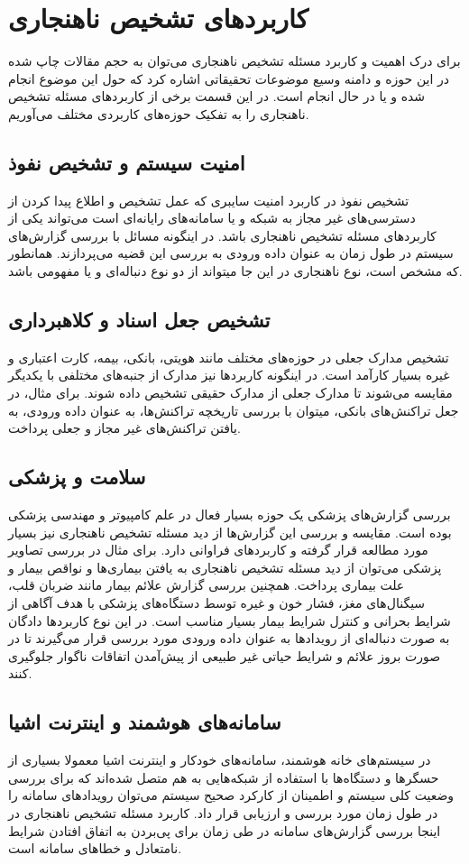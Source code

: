 \documentclass[12pt,a4paper]{report}
\begin{document}
\section {کاربرد‌های تشخیص ناهنجاری}
برای درک اهمیت و کاربرد مسئله تشخیص ناهنجاری می‌توان به حجم مقالات چاپ شده در این حوزه و دامنه وسیع موضوعات تحقیقاتی اشاره کرد که حول این موضوع انجام شده و یا در حال انجام است. در این قسمت برخی از کاربرد‌های مسئله تشخیص ناهنجاری را به تفکیک حوزه‌های کاربردی مختلف می‌آوریم.

\subsection{امنیت سیستم و تشخیص نفوذ}
تشخیص نفوذ در کاربرد امنیت سایبری که عمل تشخیص و اطلاع پیدا کردن از دسترسی‌های غیر مجاز به شبکه و یا سامانه‌های رایانه‌ای است می‌تواند یکی از کاربرد‌های مسئله تشخیص ناهنجاری باشد. در اینگونه مسائل با بررسی گزارش‌های سیستم در طول زمان به عنوان داده ورودی به بررسی این قضیه می‌پردازند. همانطور که مشخص است، نوع  ناهنجاری در این جا میتواند از دو نوع دنباله‌ای و یا مفهومی باشد.

\subsection{تشخیص جعل اسناد و کلاهبرداری}
تشخیص مدارک جعلی در حوزه‌های مختلف مانند هویتی، بانکی، بیمه، کارت اعتباری و غیره بسیار کارآمد است. در اینگونه کاربردها نیز مدارک از جنبه‌های مختلفی با یکدیگر مقایسه می‌شوند تا مدارک جعلی از مدارک حقیقی تشخیص داده شوند. برای مثال، در جعل تراکنش‌های بانکی، میتوان با بررسی تاریخچه تراکنش‌ها، به عنوان داده ورودی، به یافتن تراکنش‌های غیر مجاز و جعلی پرداخت.

\subsection{سلامت و پزشکی}
بررسی گزارش‌های پزشکی یک حوزه بسیار فعال در علم کامپیوتر و مهندسی پزشکی بوده است. مقایسه و بررسی این گزارش‌ها از دید مسئله تشخیص ناهنجاری نیز بسیار مورد مطالعه قرار گرفته و کاربرد‌های فراوانی دارد. برای مثال در بررسی تصاویر پزشکی می‌توان از دید مسئله تشخیص ناهنجاری به یافتن بیماری‌ها و نواقص بیمار و علت بیماری پرداخت. همچنین بررسی گزارش علائم بیمار مانند ضربان قلب، سیگنال‌های مغز، فشار خون و غیره توسط دستگاه‌های پزشکی با هدف آگاهی از شرایط بحرانی و کنترل شرایط بیمار بسیار مناسب است. در این نوع کاربرد‌ها دادگان به صورت دنباله‌ای از رویداد‌ها به عنوان داده ورودی مورد بررسی قرار می‌گیرند تا در صورت بروز علائم و شرایط حیاتی غیر طبیعی از پیش‌آمدن اتفاقات ناگوار جلوگیری کنند.
\subsection{سامانه‌های هوشمند و اینترنت اشیا}
در سیستم‌های خانه هوشمند، سامانه‌های خودکار و اینترنت اشیا معمولا بسیاری از حسگر‌ها و دستگاه‌ها با استفاده از شبکه‌هایی به هم متصل شده‌اند که برای بررسی وضعیت کلی سیستم و اطمینان از کارکرد صحیح سیستم می‌توان رویداد‌های سامانه را در طول زمان مورد بررسی و ارزیابی قرار داد. کاربرد مسئله تشخیص ناهنجاری در اینجا بررسی گزارش‌های سامانه در طی زمان برای پی‌بردن به اتفاق افتادن شرایط نامتعادل و خطا‌های سامانه است.
\end{document}
